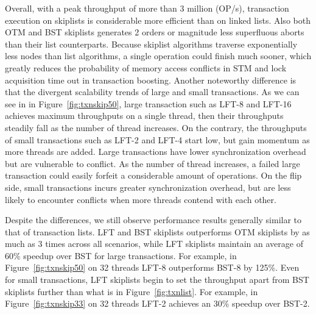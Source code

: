 \documentclass[10pt,conference,compsocconf]{IEEEtran}
\begin{document}
Overall, with a peak throughput of more than 3 million (OP/s), transaction execution on skiplists is considerable more efficient than on linked lists.
Also both OTM and BST skiplists generates 2 orders or magnitude less superfluous aborts than their list counterparts.
Because skiplist algorithms traverse exponentially less nodes than list algorithms, a single operation could finish much sooner, which greatly reduces the probability of memory access conflicts in STM and lock acquisition time out in transaction boosting.
Another noteworthy difference is that the divergent scalability trends of large and small transactions. 
As we can see in in Figure~\ref{fig:txnskip50}, large transaction such as LFT-8 and LFT-16 achieves maximum throughputs on a single thread, then their throughputs steadily fall as the number of thread increases.
On the contrary, the throughputs of small transactions such as LFT-2 and LFT-4 start low, but gain momentum as more threads are added.
Large transactions have lower synchronization overhead but are vulnerable to conflict.
As the number of thread increases, a failed large transaction could easily forfeit a considerable amount of operations.
On the flip side, small transactions incurs greater synchronization overhead, but are less likely to encounter conflicts when more threads contend with each other.

Despite the differences, we still observe performance results generally similar to that of transaction lists.
LFT and BST skiplists outperforms OTM skiplists by as much as 3 times across all scenarios, while LFT skiplists maintain an average of 60\% speedup over BST for large transactions.
For example, in Figure~\ref{fig:txnskip50} on 32 threads LFT-8 outperforms BST-8 by 125\%.
Even for small transactions, LFT skiplists begin to set the throughput apart from BST skiplists further than what is in Figure~\ref{fig:txnlist}.
For example, in Figure~\ref{fig:txnskip33} on 32 threads LFT-2 achieves an 30\% speedup over BST-2.
\end{document}
